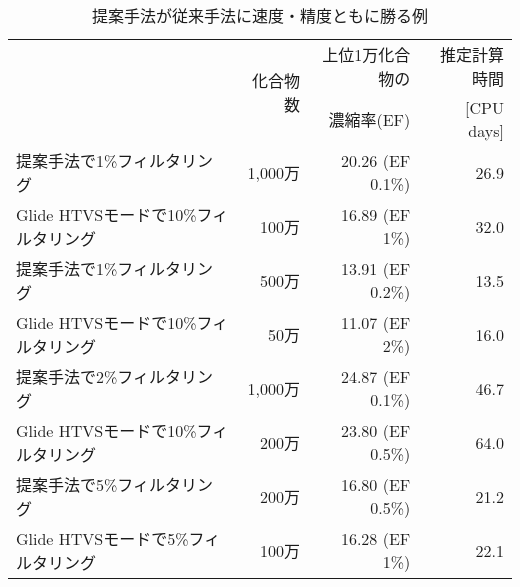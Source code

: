 \begin{table}[p] \centering
	\caption{提案手法が従来手法に速度・精度ともに勝る例}
	\label{table:win_proposal_case}
	\begin{tabular}{l|rrr}
	\hline
												&\multirow{2}{*}{化合物数}	&上位1万化合物の		&推定計算時間	\\
												&														&濃縮率(EF)				&[CPU days]		\\ \hline
	提案手法で1\%フィルタリング		&1,000万											&20.26 (EF 0.1\%)		&26.9				\\
	Glide HTVSモードで10\%フィルタリング	&100万												&16.89 (EF 1\%)			&32.0				\\ \hline
	提案手法で1\%フィルタリング		&500万												&13.91 (EF 0.2\%)		&13.5				\\
	Glide HTVSモードで10\%フィルタリング	&50万												&11.07 (EF 2\%)			&16.0				\\ \hline
	提案手法で2\%フィルタリング		&1,000万											&24.87 (EF 0.1\%)		&46.7				\\
	Glide HTVSモードで10\%フィルタリング	&200万												&23.80 (EF 0.5\%)		&64.0				\\ \hline
	提案手法で5\%フィルタリング		&200万												&16.80 (EF 0.5\%)		&21.2				\\
	Glide HTVSモードで5\%フィルタリング		&100万												&16.28 (EF 1\%)			&22.1				\\ \hline
	

	\end{tabular}
\end{table}
	

